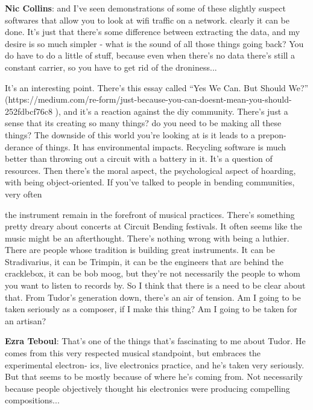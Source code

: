 \textbf{Nic Collins}: and I’ve seen demonstrations of some of these slightly suspect softwares that allow you to look at wifi traffic on a network. clearly it can be done. It’s just that there’s some difference between extracting the data, and my desire is so much simpler - what is the sound of all those things going back? You do have to do a little of stuff, because even when there’s no data there’s still a constant carrier, so you have to get rid of the droniness...
					
It’s an interesting point. There’s this  essay called ``Yes We Can. But Should We?'' (https://medium.com/re-form/just-because-you-can-doesnt-mean-you-should-252fdbcf76c8 ), and it’s a reaction against the diy community. There’s just a sense that its creating so many things? do you need to be making all these things? The downside of this world you’re looking at is it leads to a prepon- derance of things. It has environmental impacts. Recycling software is much better than throwing out a circuit with a battery in it. It’s a question of resources. Then there’s the moral aspect, the psychological aspect of hoarding, with being object-oriented. If you’ve talked to people in bending communities, very often
									
the instrument remain in the forefront of musical practices. There’s something pretty dreary about concerts at Circuit Bending festivals. It often seems like the music might be an afterthought. There’s nothing wrong with being a luthier. There are people whose tradition is building great instruments. It can be Stradivarius, it can be Trimpin, it can be the engineers that are behind the cracklebox, it can be bob moog, but they’re not necessarily the people to whom you want to listen to records by. So I think that there is a need to be clear about that. From Tudor’s generation down, there’s an air of tension. Am I going to be taken seriously as a composer, if I make this thing? Am I going to be taken for an artisan?
					
\textbf{Ezra Teboul}: That’s one of the things that’s fascinating to me about Tudor. He comes from this very respected musical standpoint, but embraces the experimental electron- ics, live electronics practice, and he’s taken very seriously. But that seems to be mostly because of where he’s coming from. Not necessarily because people objectively thought his electronics were producing compelling compositions...
					

